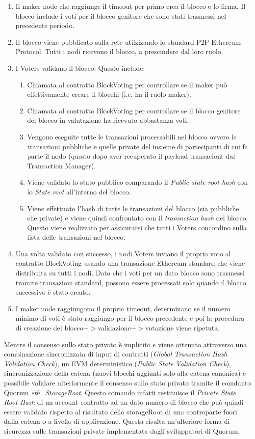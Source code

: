 \begin{enumerate}
	\item Il maker node che raggiunge il timeout per primo crea il blocco e lo firma. Il blocco include i voti per il blocco genitore che sono stati trasmessi nel precedente periodo.
	\item Il blocco viene pubblicato sulla rete utilzizando lo standard P2P Ethereum Protocol. Tutti i nodi ricevono il blocco, a prescindere dal loro ruolo.
	\item I Voters validano il blocco. Questo include:
	      \begin{enumerate}
	      	\item Chiamata al contratto BlockVoting per controllare se il maker può effettivamente creare il blocchi (i.e. ha il ruolo maker).
	      	\item Chiamata al contratto BlockVoting per controllare se il blocco genitore del blocco in valutazione ha ricevuto abbastanza voti.
	      	\item Vengono eseguite tutte le transazioni processabili nel blocco ovvero le transazioni pubbliche e quelle private del insieme di partecipanti di cui fa parte il nodo (questo dopo aver recuperato il payload transaciont dal Transaction Manager).
	      	\item Viene validato lo stato pubblico comparando il \emph{Public state root hash} con lo \emph{State root} all'interno del blocco.
	      	\item Viene effettuato l'hash di tutte le transazioni del blocco (sia pubbliche che private) e viene quindi confrontato con il \emph{transaction hash} del blocco. Questo viene realizzato per assicurarsi che tutti i Voters concordino sulla lista delle transazioni nel blocco.
	      \end{enumerate}
	\item Una volta validato con successo, i nodi Voters inviano il proprio voto al contratto BlockVoting usando una transazione Ethereum standard che viene distribuita su tutti i nodi. Dato che i voti per un dato blocco sono trasmessi tramite transazioni standard, possono essere processati solo quando il blocco successivo è stato creato.
	\item I maker node raggiungono il proprio timeout, determinano se il numero minimo di voti è stato raggiungo per il blocco precedente e poi la procedura di creazione del blocco$->$validazione$->$votazione viene ripetuta.
\end{enumerate}%
Mentre il consenso sullo stato privato è implicito e viene ottenuto attraverso una combinazione sincronizzata di input di contratti (\emph{Global Transaction Hash Validation Check}), un EVM deterministico (\emph{Public State Validation Check}), sincronizzazione della catena (nuovi blocchi aggiunti solo alla catena canonica) è possibile validare ulteriormente il consenso sullo stato privato tramite il comdanto Quorum \emph{eth\_StorageRoot}. Questo comando infatti restituisce il \emph{Private State Root Hash} di un account contratto ad un dato numero di blocco che può quindi essere validato rispetto al risultato dello storageRoot di una controparte fuori dalla catena o a livello di applicazione. Questa risulta un'ulteriore forma di sicurezza sulle transazioni private implementata dagli sviluppatori di Quorum. %
